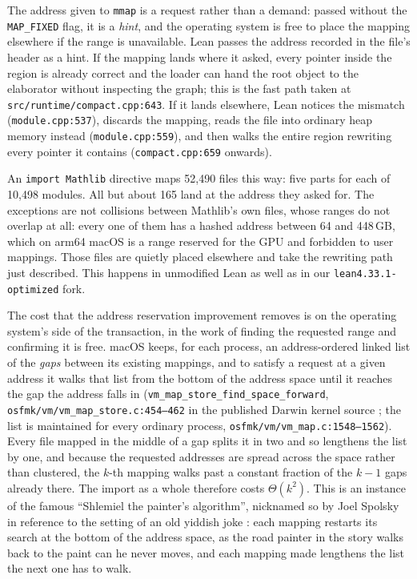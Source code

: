 \documentclass{article}
\newcommand{\Lean}{Lean\xspace}      %
\newcommand{\mathlib}{Mathlib\xspace}
\newcommand{\altlean}{\texttt{lean4.33.1-\allowbreak optimized}\xspace}
\begin{document}
The address given to \texttt{mmap} is a request rather than a demand: passed without the \texttt{MAP\_FIXED} flag, it is a \emph{hint}, and the operating system is free to place the mapping elsewhere if the range is unavailable. \Lean passes the address recorded in the file's header as a hint. If the mapping lands where it asked, every pointer inside the region is already correct and the loader can hand the root object to the elaborator without inspecting the graph; this is the fast path taken at \texttt{src/runtime/compact.cpp:643}. If it lands elsewhere, \Lean notices the mismatch (\texttt{module.cpp:537}), discards the mapping, reads the file into ordinary heap memory instead (\texttt{module.cpp:559}), and then walks the entire region rewriting every pointer it contains (\texttt{compact.cpp:659} onwards).

An \texttt{import Mathlib} directive maps 52{,}490 files this way: five parts for each of 10{,}498 modules. All but about 165 land at the address they asked for. The exceptions are not collisions between \mathlib's own files, whose ranges do not overlap at all: every one of them has a hashed address between 64 and 448\,GB, which on arm64 macOS is a range reserved for the GPU and forbidden to user mappings. Those files are quietly placed elsewhere and take the rewriting path just described. This happens in unmodified \Lean as well as in our \altlean fork.

The cost that the address reservation improvement removes is on the operating system's side of the transaction, in the work of finding the requested range and confirming it is free. macOS keeps, for each process, an address-ordered linked list of the \emph{gaps} between its existing mappings, and to satisfy a request at a given address it walks that list from the bottom of the address space until it reaches the gap the address falls in (\texttt{vm\_map\_store\_find\_space\_forward}, \texttt{osfmk/vm/vm\_map\_store.c:454--462} in the published Darwin kernel source \cite{xnu}; the list is maintained for every ordinary process, \texttt{osfmk/vm/\allowbreak vm\_map.c:1548--1562}). Every file mapped in the middle of a gap splits it in two and so lengthens the list by one, and because the requested addresses are spread across the space rather than clustered, the $k$-th mapping walks past a constant fraction of the $k-1$ gaps already there. The import as a whole therefore costs $\Theta(k^2)$. This is an instance of the famous ``Shlemiel the painter's algorithm'', nicknamed so by Joel Spolsky in reference to the setting of an old yiddish joke \cite{shlemiel}: each mapping restarts its search at the bottom of the address space, as the road painter in the story walks back to the paint can he never moves, and each mapping made lengthens the list the next one has to walk.
\end{document}
